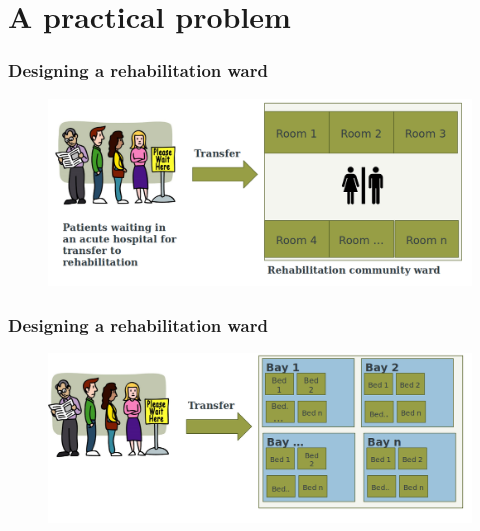 \documentclass[aspectratio=169]{beamer}
\begin{document}
\section{A practical problem}
\begin{frame}
\frametitle{Designing a rehabilitation ward}
\begin{figure}
\includegraphics[width=1.0\linewidth]{ward1.png}
\end{figure}
\end{frame}



\begin{frame}
\frametitle{Designing a rehabilitation ward}
\begin{figure}
\includegraphics[width=1.0\linewidth]{ward2.png}
\end{figure}
\end{frame}

\end{document}
